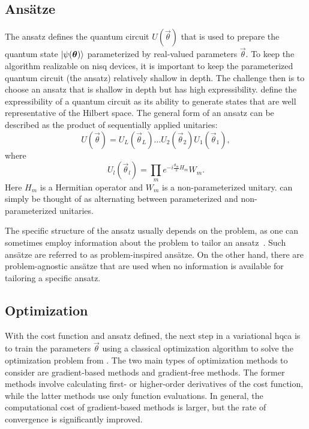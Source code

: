 \subsection{Ans{\"a}tze}
The ansatz defines the quantum circuit $U(\vec{\theta})$ that is used to prepare the quantum state $\vert{\psi(\bm{\theta})}\rangle$ parameterized by real-valued parameters $\vec{\theta}$.
To keep the algorithm realizable on \gls{nisq} devices, it is important to keep the parameterized quantum circuit (the ansatz) relatively shallow in depth.
The challenge then is to choose an ansatz that is shallow in depth but has high expressibility.
\textcite{sim2019expressibility} define the expressibility of a quantum circuit as its ability to generate states that are well representative of the Hilbert space.
The general form of an ansatz can be described as the product of sequentially applied unitaries:
\begin{equation}
U(\vec{\theta}) = U_L(\vec{\theta}_L) \ldots U_2(\vec{\theta}_2)U_1(\vec{\theta}_1),
\end{equation}
where
\begin{equation} \label{eqn:ansatz-unitary}
U_l(\vec{\theta}_l) = \prod_{m} e^{-i \tfrac{\theta_m}{2} H_m}W_m.
\end{equation}
Here $H_m$ is a Hermitian operator and $W_m$ is a non-parameterized unitary.
 can simply be thought of as alternating between parameterized and non-parameterized unitaries.

The specific structure of the ansatz usually depends on the problem, as one can sometimes employ information about the problem to tailor an ansatz~\cite{cerezo2020variational}.
Such ans{\"a}tze are referred to as problem-inspired ans{\"a}tze.
On the other hand, there are problem-agnostic ans{\"a}tze that are used when no information is available for tailoring a specific ansatz.

\subsection{Optimization}
With the cost function and ansatz defined, the next step in a variational \gls{hqca} is to train the parameters $\vec{\theta}$ using a classical optimization algorithm to solve the optimization problem from .
The two main types of optimization methods to consider are gradient-based methods and gradient-free methods.
The former methods involve calculating first- or higher-order derivatives of the cost function, while the latter methods use only function evaluations.
In general, the computational cost of gradient-based methods is larger, but the rate of convergence is significantly improved.

